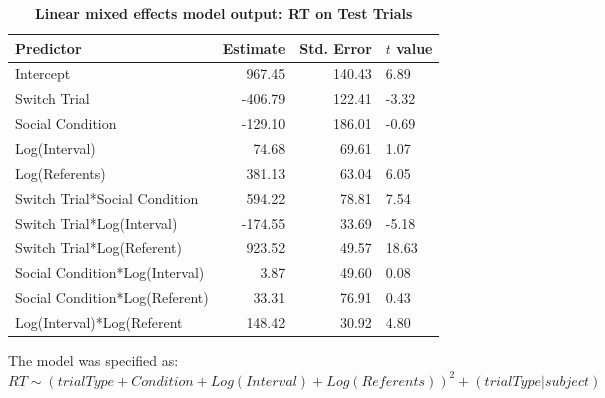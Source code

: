 \documentclass[man]{apa2}
\begin{document}
\begin{table}[H]
\centering
\caption{\textbf{Linear mixed effects model output: RT on Test Trials}}
\begin{tabular}{lrrl}
 Predictor & Estimate & Std. Error & $t$ value \\ 
  \hline
Intercept & 967.45 & 140.43 & 6.89 \\ 
  Switch Trial & -406.79 & 122.41 & -3.32 \\ 
  Social Condition & -129.10 & 186.01 & -0.69 \\ 
  Log(Interval) & 74.68 & 69.61 & 1.07 \\ 
  Log(Referents) & 381.13 & 63.04 & 6.05 \\ 
  Switch Trial*Social Condition & 594.22 & 78.81 & 7.54 \\ 
  Switch Trial*Log(Interval) & -174.55 & 33.69 & -5.18 \\ 
  Switch Trial*Log(Referent) & 923.52 & 49.57 & 18.63 \\ 
  Social Condition*Log(Interval) & 3.87 & 49.60 & 0.08 \\ 
  Social Condition*Log(Referent) & 33.31 & 76.91 & 0.43 \\ 
  Log(Interval)*Log(Referent & 148.42 & 30.92 & 4.80 \\ 
   \hline
\end{tabular}
\raggedright

The model was specified as: 
$RT \sim (trialType + Condition + Log(Interval) + Log(Referents))^2 + (trialType | subject)$

\end{table}




\end{document}
